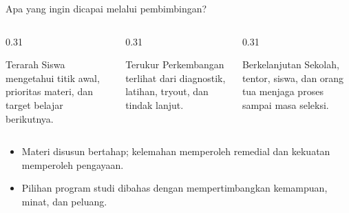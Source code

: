 \begin{frame}{Apa yang ingin dicapai melalui pembimbingan?}
  \begin{columns}[T,onlytextwidth]
    \begin{column}{0.31\textwidth}
      \begin{block}{Terarah}
        Siswa mengetahui titik awal, prioritas materi, dan target belajar berikutnya.
      \end{block}
    \end{column}
    \begin{column}{0.31\textwidth}
      \begin{block}{Terukur}
        Perkembangan terlihat dari diagnostik, latihan, tryout, dan tindak lanjut.
      \end{block}
    \end{column}
    \begin{column}{0.31\textwidth}
      \begin{block}{Berkelanjutan}
        Sekolah, tentor, siswa, dan orang tua menjaga proses sampai masa seleksi.
      \end{block}
    \end{column}
  \end{columns}
  \vspace{0.20cm}
  {\fontsize{11.8}{14.8}\selectfont
  \begin{itemize}
    \item Materi disusun bertahap; kelemahan memperoleh remedial dan kekuatan memperoleh pengayaan.
    \item Pilihan program studi dibahas dengan mempertimbangkan kemampuan, minat, dan peluang.
  \end{itemize}}
\end{frame}

